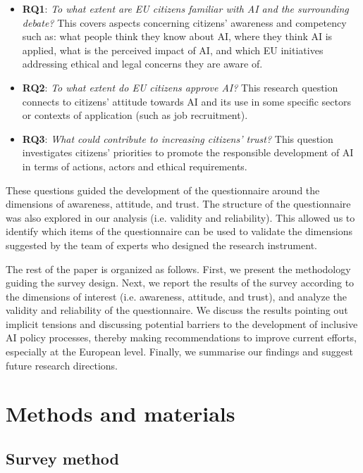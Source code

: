 \documentclass{article}
\begin{document}
\begin{itemize}
    \item \textbf{RQ1}: \emph{To what extent are EU citizens familiar with AI and the surrounding debate?} This covers aspects concerning citizens' awareness and competency such as: what people think they know about AI, where they think AI is applied, what is the perceived impact of AI, and which EU initiatives addressing ethical and legal concerns they are aware of.
    \item \textbf{RQ2}: \emph{To what extent do EU citizens approve AI?} This research question connects to citizens' attitude towards AI and its use in some specific sectors or contexts of application (such as job recruitment). 
    \item \textbf{RQ3}: \emph{What could contribute to increasing citizens' trust?} This question investigates citizens' priorities to promote the responsible development of AI in terms of actions, actors and ethical requirements.
\end{itemize}
These questions guided the development of the questionnaire around the dimensions of awareness, attitude, and trust. The structure of the questionnaire was also explored in our analysis (i.e. validity and reliability). This allowed us to identify which items of the questionnaire can be used to validate the dimensions suggested by the team of experts who designed the research instrument.

The rest of the paper is organized as follows. First, we present the methodology guiding the survey design. Next, we report the results of the survey according to the dimensions of interest (i.e. awareness, attitude, and trust), and analyze the validity and reliability of the questionnaire. We discuss the results pointing out implicit tensions and discussing potential barriers to the development of inclusive AI policy processes, thereby making recommendations to improve current efforts, especially at the European level. Finally, we summarise our findings and suggest future research directions.  

\section*{Methods and materials}

\subsection*{Survey method}%
\end{document}
